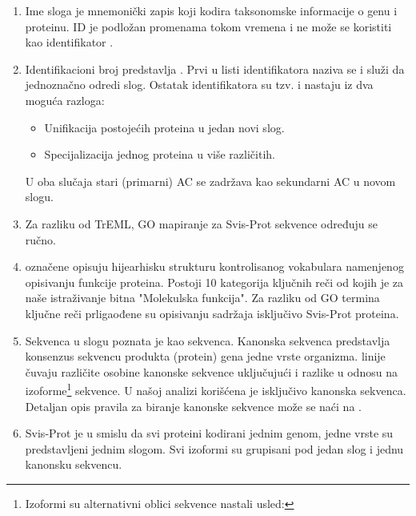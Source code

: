 \begin{enumerate}
  \item Ime sloga   je mnemonički zapis koji kodira
    taksonomske informacije o genu i proteinu. ID je podložan promenama tokom vremena
    i ne može se koristiti kao identifikator \parencite{www_svisprot}.
  \item Identifikacioni broj predstavlja  .
    Prvi u listi identifikatora naziva se  i služi da
    jednoznačno odredi slog. Ostatak identifikatora su tzv.  i
    nastaju iz dva moguća razloga: \parencite{svisprot2003, www_svisprot}
    \begin{itemize}
      \item Unifikacija postojećih proteina u jedan novi slog. 
      \item Specijalizacija jednog proteina u više različitih.
    \end{itemize}
    U oba slučaja stari (primarni) AC se zadržava kao sekundarni AC u novom slogu.

  \item Za razliku od TrEML, GO mapiranje za Svis-Prot sekvence određuju se ručno\parencite{www_svisprot}.

  \item {}  označene  opisuju
    hijearhisku strukturu kontrolisanog vokabulara namenjenog opisivanju
    funkcije proteina. Postoji 10 kategorija ključnih reči od kojih je za naše
    istraživanje bitna "Molekulska funkcija"\parencite{svisprot2003}.  Za razliku od GO termina ključne
    reči prligaođene su opisivanju sadržaja isključivo Svis-Prot proteina\parencite{www_svisprot}.

  \item Sekvenca  u slogu poznata je kao 
     sekvenca. Kanonska sekvenca predstavlja konsenzus sekvencu
    produkta (protein) gena jedne vrste organizma.  
    linije čuvaju različite osobine kanonske sekvence uključujući i razlike u
    odnosu na izoforme\footnote{Izoformi su alternativni oblici sekvence
      nastali usled:  } sekvence.  U našoj
    analizi korišćena je isključivo kanonska sekvenca. Detaljan opis pravila za
    biranje kanonske sekvence može se naći na \parencite{www_svisprot}.

  \item
    \label{red}
    Svis-Prot je  u smislu da svi proteini
    kodirani jednim genom, jedne vrste su predstavljeni jednim slogom. Svi
    izoformi su grupisani pod jedan slog i jednu kanonsku sekvencu\parencite{nonRedundant}.


\end{enumerate}
